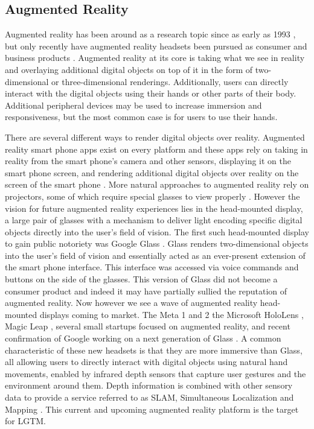 \documentclass[12pt]{report}
\begin{document}
\subsection{Augmented Reality}
Augmented reality has been around as a research topic since as early as 1993 \cite{RealWorldArWellnet1993}, but only recently have augmented reality headsets been pursued as consumer and business products \cite{MagicLeapWebsite,MetaWebsite,HoloLensWebsite,GoogleGlassWebsite}. Augmented reality at its core is taking what we see in reality and overlaying additional digital objects on top of it in the form of two-dimensional or three-dimensional renderings. Additionally, users can directly interact with the digital objects using their hands or other parts of their body. Additional peripheral devices may be used to increase immersion and responsiveness, but the most common case is for users to use their hands. \par

There are several different ways to render digital objects over reality. Augmented reality smart phone apps exist on every platform and these apps rely on taking in reality from the smart phone's camera and other sensors, displaying it on the smart phone screen, and rendering additional digital objects over reality on the screen of the smart phone \cite{LayarArApp,GoogleTranslate,IonRoadArApp}. More natural approaches to augmented reality rely on projectors, some of which require special glasses to view properly \cite{VtCubeWebsite}. However the vision for future augmented reality experiences lies in the head-mounted display, a large pair of glasses with a mechanism to deliver light encoding specific digital objects directly into the user's field of vision. The first such head-mounted display to gain public notoriety was Google Glass \cite{GoogleGlassWebsite}. Glass renders two-dimensional objects into the user's field of vision and essentially acted as an ever-present extension of the smart phone interface. This interface was accessed via voice commands and buttons on the side of the glasses. This version of Glass did not become a consumer product and indeed it may have partially sullied the reputation of augmented reality. Now however we see a wave of augmented reality head-mounted displays coming to market. The Meta 1 and 2 \cite{MetaWebsite} the Microsoft HoloLens \cite{HoloLensWebsite}, Magic Leap \cite{MagicLeapWebsite}, several small startups focused on augmented reality, and recent confirmation of Google working on a next generation of Glass \cite{WiredGoogleGlassNextGen2015}. A common characteristic of these new headsets is that they are more immersive than Glass, all allowing users to directly interact with digital objects using natural hand movements, enabled by infrared depth sensors that capture user gestures and the environment around them. Depth information is combined with other sensory data to provide a service referred to as SLAM, Simultaneous Localization and Mapping \cite{ParallelTrackingAndMappingKlein2007,MonoSlamDavison2007,VisualIntertialOdometryNonlinearLeutenegger2014,ProjectTangoWebsite,SlamPart1Durrant-Whyte2006}. This current and upcoming augmented reality platform is the target for LGTM. \par
\end{document}
